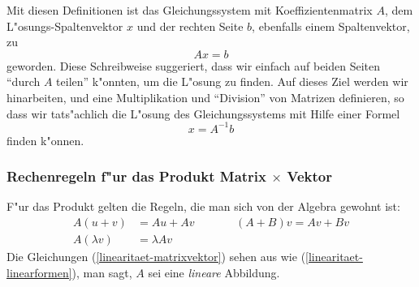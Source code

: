 Mit diesen Definitionen ist das Gleichungssystem mit Koeffizientenmatrix $A$,
dem L"osungs-Spaltenvektor $x$ und der rechten Seite $b$, ebenfalls einem
Spaltenvektor, zu
$$Ax=b$$
geworden. Diese Schreibweise suggeriert, dass wir einfach auf beiden
Seiten ``durch $A$ teilen'' k"onnten, um die L"osung zu finden. Auf dieses
Ziel werden wir hinarbeiten, und eine Multiplikation und ``Division''
von Matrizen definieren, so dass wir tats"achlich die L"osung des Gleichungssystems
mit Hilfe einer Formel
$$
x=A^{-1}b
$$
finden k"onnen.

\subsubsection{Rechenregeln f"ur das Produkt Matrix $\times$ Vektor}
F"ur das Produkt gelten die Regeln, die man sich von der Algebra 
gewohnt ist:
\begin{equation}
\begin{aligned}
A(u+v)&=Au+Av&\qquad&(A+B)v=Av+Bv\\
A(\lambda v)&=\lambda Av
\end{aligned}
\label{linearitaet-matrixvektor}
\end{equation}
Die Gleichungen (\ref{linearitaet-matrixvektor}) sehen aus wie
(\ref{linearitaet-linearformen}),
man sagt, $A$ sei eine {\em lineare} Abbildung.

